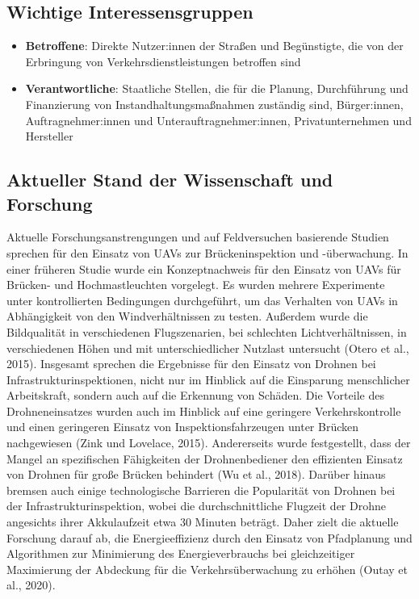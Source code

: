 \documentclass[
]{book}
\providecommand{\tightlist}{%
  \setlength{\itemsep}{0pt}\setlength{\parskip}{0pt}}
\begin{document}
\hypertarget{wichtige-interessensgruppen-7}{%
\subsection*{Wichtige Interessensgruppen}\label{wichtige-interessensgruppen-7}}

\begin{itemize}
\tightlist
\item
  \textbf{Betroffene}: Direkte Nutzer:innen der Straßen und Begünstigte, die von der Erbringung von Verkehrsdienstleistungen betroffen sind
\item
  \textbf{Verantwortliche}: Staatliche Stellen, die für die Planung, Durchführung und Finanzierung von Instandhaltungsmaßnahmen zuständig sind, Bürger:innen, Auftragnehmer:innen und Unterauftragnehmer:innen, Privatunternehmen und Hersteller
\end{itemize}

\hypertarget{aktueller-stand-der-wissenschaft-und-forschung-7}{%
\subsection*{Aktueller Stand der Wissenschaft und Forschung}\label{aktueller-stand-der-wissenschaft-und-forschung-7}}

Aktuelle Forschungsanstrengungen und auf Feldversuchen basierende Studien sprechen für den Einsatz von UAVs zur Brückeninspektion und -überwachung. In einer früheren Studie wurde ein Konzeptnachweis für den Einsatz von UAVs für Brücken- und Hochmastleuchten vorgelegt. Es wurden mehrere Experimente unter kontrollierten Bedingungen durchgeführt, um das Verhalten von UAVs in Abhängigkeit von den Windverhältnissen zu testen. Außerdem wurde die Bildqualität in verschiedenen Flugszenarien, bei schlechten Lichtverhältnissen, in verschiedenen Höhen und mit unterschiedlicher Nutzlast untersucht (Otero et al., 2015). Insgesamt sprechen die Ergebnisse für den Einsatz von Drohnen bei Infrastrukturinspektionen, nicht nur im Hinblick auf die Einsparung menschlicher Arbeitskraft, sondern auch auf die Erkennung von Schäden. Die Vorteile des Drohneneinsatzes wurden auch im Hinblick auf eine geringere Verkehrskontrolle und einen geringeren Einsatz von Inspektionsfahrzeugen unter Brücken nachgewiesen (Zink und Lovelace, 2015). Andererseits wurde festgestellt, dass der Mangel an spezifischen Fähigkeiten der Drohnenbediener den effizienten Einsatz von Drohnen für große Brücken behindert (Wu et al., 2018). Darüber hinaus bremsen auch einige technologische Barrieren die Popularität von Drohnen bei der Infrastrukturinspektion, wobei die durchschnittliche Flugzeit der Drohne angesichts ihrer Akkulaufzeit etwa 30 Minuten beträgt. Daher zielt die aktuelle Forschung darauf ab, die Energieeffizienz durch den Einsatz von Pfadplanung und Algorithmen zur Minimierung des Energieverbrauchs bei gleichzeitiger Maximierung der Abdeckung für die Verkehrsüberwachung zu erhöhen (Outay et al., 2020).
\end{document}
